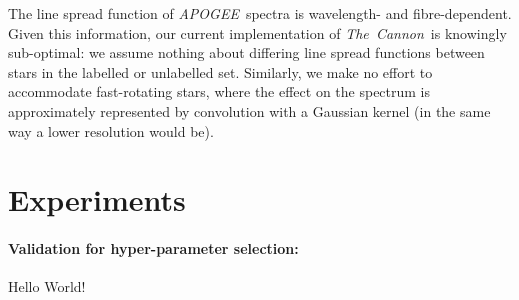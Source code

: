 \documentclass[12pt,preprint]{aastex}
\newcommand{\project}[1]{\textsl{#1}}
\newcommand{\TheCannon}{\project{The~Cannon}}
\newcommand{\tc}{\TheCannon}
\newcommand{\acronym}[1]{{\small{#1}}}
\newcommand{\apogee}{\project{\acronym{APOGEE}}}
\begin{document}
The line spread function of \apogee\ spectra is wavelength- and fibre-dependent.
Given this information, our current implementation of \tc\ is knowingly 
sub-optimal: we assume nothing about differing line spread functions between 
stars in the labelled or unlabelled set. Similarly, we make no effort to 
accommodate fast-rotating stars, where the effect on the spectrum is 
approximately represented by convolution with a Gaussian kernel (in the same way
a lower resolution would be). 







\section{Experiments}

\paragraph{Validation for hyper-parameter selection:}
Hello World!
\end{document}
